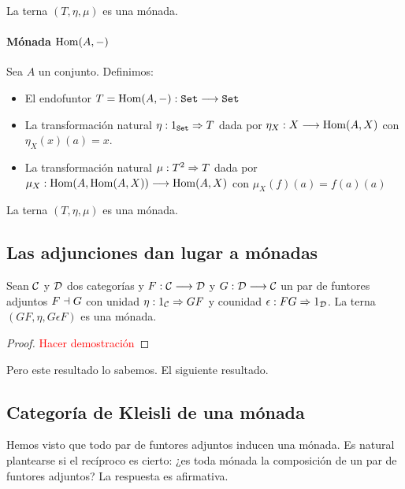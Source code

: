 La terna $(T, \eta, \mu)$ es una mónada.


\paragraph{Mónada $\operatorname{Hom}(A, -)$}
Sea $A$ un conjunto. Definimos:

\begin{itemize}
\item El endofuntor $T = \operatorname{Hom}(A, -) : \texttt{Set}\longrightarrow \texttt{Set}$
\item La transformación natural $\eta : 1_{\texttt{Set}}\Rightarrow T$ dada
  por $\eta_X : X\longrightarrow \operatorname{Hom}(A, X)$ con $\eta_X(x)(a) = x$.
\item La transformación natural $\mu: T^2\Rightarrow T$ dada por
  $\mu_X : \operatorname{Hom}(A, \operatorname{Hom}(A, X))\longrightarrow \operatorname{Hom}(A, X)$ con
  $\mu_X(f)(a) = f(a)(a)$
\end{itemize}

La terna $(T, \eta, \mu)$ es una mónada.

\subsection{Las adjunciones dan lugar a mónadas}
\begin{theorem}
Sean $\mathcal{C}$ y $\mathcal{D}$ dos categorías y $F : \mathcal{C}\longrightarrow \mathcal{D}$ y $G: \mathcal{D}\longrightarrow \mathcal{C}$ un
par de funtores adjuntos $F \dashv G$ con unidad
$\eta : 1_{\mathcal{C}}\Rightarrow GF$ y counidad $\epsilon: FG\Rightarrow 1_{\mathcal{D}}$. La terna
$(GF, \eta, G\epsilon F)$ es una mónada.
\end{theorem}
\begin{proof}
  \textcolor{red}{Hacer demostración}
\end{proof}

Pero este resultado lo sabemos. El siguiente resultado.

\subsection{Categoría de Kleisli de una mónada}
Hemos visto que todo par de funtores adjuntos inducen una mónada.
Es natural plantearse si el recíproco es cierto: ¿es toda mónada
la composición de un par de funtores adjuntos?
La respuesta es afirmativa.

